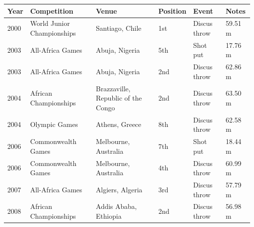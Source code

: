 \documentclass{article}
\begin{document}
\begin{tabular}{llllll}
\toprule
Year & Competition & Venue & Position & Event & Notes \\
\midrule
2000 & World Junior Championships & Santiago, Chile & 1st & Discus throw & 59.51 m \\
2003 & All-Africa Games & Abuja, Nigeria & 5th & Shot put & 17.76 m \\
2003 & All-Africa Games & Abuja, Nigeria & 2nd & Discus throw & 62.86 m \\
2004 & African Championships & Brazzaville, Republic of the Congo & 2nd & Discus throw & 63.50 m \\
2004 & Olympic Games & Athens, Greece & 8th & Discus throw & 62.58 m \\
2006 & Commonwealth Games & Melbourne, Australia & 7th & Shot put & 18.44 m \\
2006 & Commonwealth Games & Melbourne, Australia & 4th & Discus throw & 60.99 m \\
2007 & All-Africa Games & Algiers, Algeria & 3rd & Discus throw & 57.79 m \\
2008 & African Championships & Addis Ababa, Ethiopia & 2nd & Discus throw & 56.98 m \\
\bottomrule
\end{tabular}
\end{document}
